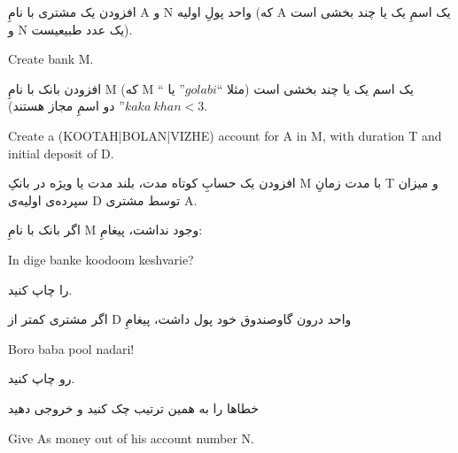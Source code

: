 \documentclass[]{article}
\begin{document}
افزودن یک مشتری با نامِ A و N واحد پولِ اولیه (که A یک اسمِ یک یا چند بخشی است و N یک عدد طبیعیست).

\hrulefill



\begin{tcolorbox}[boxrule=0pt]
	\begin{latin}
  	  \large{
  	  	Create bank M.
		}
	\end{latin}
\end{tcolorbox}

افزودن بانک با نامِ M (که M یک اسم یک یا چند بخشی است (مثلا “$golabi$” یا “$kaka ~ khan<3$” دو اسمِ مجاز هستند).

\hrulefill



\begin{tcolorbox}[boxrule=0pt]
	\begin{latin}
  	  \large{
  	  	Create a (KOOTAH|BOLAN|VIZHE) account for A in M, with duration T and initial deposit of D.
		}
	\end{latin}
\end{tcolorbox}

افزودن یک حسابِ کوتاه مدت، بلند مدت یا ویژه در بانکِ M با مدت زمانِ T و میزان سپرده‌ی اولیه‌ی D توسط مشتری A.

اگر بانک با نامِ M وجود نداشت، پیغامِ:

\begin{tcolorbox}[boxrule=0pt]
	\begin{latin}
  	  \large{
  	  	In dige banke koodoom keshvarie?
		}
	\end{latin}
\end{tcolorbox}


را چاپ کنید.

اگر مشتری کمتر از D واحد درون گاوصندوق خود پول داشت، پیغامِ

\begin{tcolorbox}[boxrule=0pt]
	\begin{latin}
  	  \large{
  	  	Boro baba pool nadari!
		}
	\end{latin}
\end{tcolorbox}


رو چاپ کنید.

خطاها را به همین ترتیب چک کنید و خروجی دهید

\hrulefill



\begin{tcolorbox}[boxrule=0pt]
	\begin{latin}
  	  \large{
  	  	Give A\textquotesingle s money out of his account number N.
		}
	\end{latin}
\end{tcolorbox}
\end{document}
